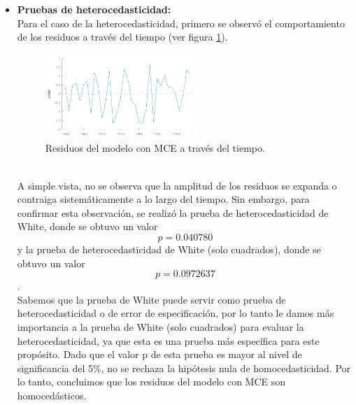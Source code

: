 \documentclass[12pt]{article}
\begin{document}
\begin{itemize}
    \item \textbf{Pruebas de heterocedasticidad:}\\
    Para el caso de la heterocedasticidad, primero se observó el comportamiento de los residuos
    a través del tiempo (ver figura \ref{fig:residuos_time}).\\
    \begin{figure}[h!]
        \centering
        \includegraphics[width=0.55\textwidth]{imagenes/resi_graf.pdf}
        \caption{Residuos del modelo con MCE a través del tiempo.}
        \label{fig:residuos_time}
    \end{figure}\\
    A simple vista, no se observa que la amplitud de los residuos se expanda o contraiga sistemáticamente
    a lo largo del tiempo. Sin embargo, para confirmar esta observación, se realizó la prueba de 
    heterocedasticidad de White, donde se obtuvo un valor $$p = 0.040780 $$ y la prueba de heterocedasticidad
    de White (solo cuadrados), donde se obtuvo un valor $$p= 0.0972637$$.\\
    Sabemos que la prueba de White puede servir como prueba de heterocedasticidad o de error de especificación,
    por lo tanto le damos más importancia a la prueba de White (solo cuadrados) para evaluar la heterocedasticidad,
    ya que esta es una prueba más específica para este propósito. Dado que el valor p de esta prueba es mayor
    al nivel de significancia del 5\%, no se rechaza la hipótesis nula de homocedasticidad. Por lo tanto, concluimos 
    que los residuos del modelo con MCE son homocedásticos.


\end{itemize}
\end{document}
